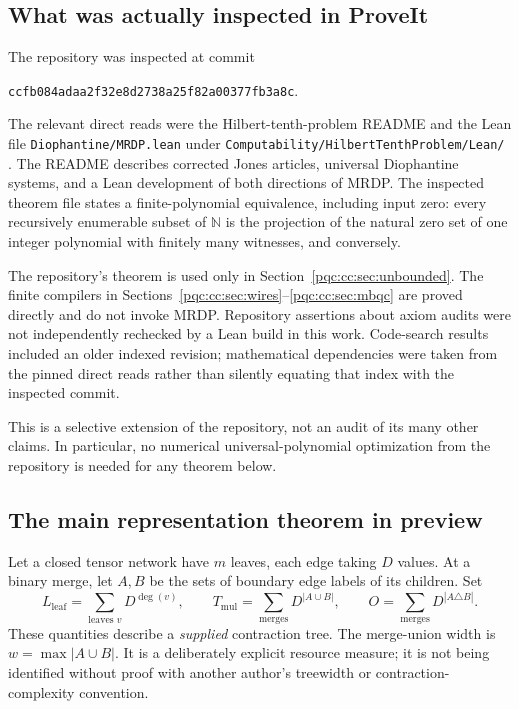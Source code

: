 \documentclass[11pt,letterpaper]{article}
\numberwithin{equation}{section}
\theoremstyle{definition}
\theoremstyle{remark}
\newcommand{\N}{\mathbb N}
\newcommand{\SHA}{\texttt{ccfb084adaa2f32e8d2738a25f82a00377fb3a8c}}
\newcommand{\Lleaf}{L_{\mathrm{leaf}}}
\newcommand{\Tmul}{T_{\mathrm{mul}}}
\begin{document}
\subsection{What was actually inspected in ProveIt}

The repository was inspected at commit
\begin{center}\small\SHA.\end{center}
The relevant direct reads were the Hilbert-tenth-problem README and the Lean
file \texttt{Diophantine/MRDP.lean} under
\texttt{Computability/HilbertTenthProblem/Lean/} \cite{b62s10-ProveItReadme,b62s10-ProveItMRDP}.
The README describes corrected Jones articles, universal Diophantine systems,
and a Lean development of both directions of MRDP. The inspected theorem file
states a finite-polynomial equivalence, including input zero: every recursively
enumerable subset of $\N$ is the projection of the natural zero set of one
integer polynomial with finitely many witnesses, and conversely.

The repository's theorem is used only in Section~\ref{pqc:cc:sec:unbounded}. The finite
compilers in Sections~\ref{pqc:cc:sec:wires}--\ref{pqc:cc:sec:mbqc} are proved directly and do
not invoke MRDP. Repository assertions about axiom audits were not independently
rechecked by a Lean build in this work. Code-search results included an older
indexed revision; mathematical dependencies were taken from the pinned direct
reads rather than silently equating that index with the inspected commit.

This is a selective extension of the repository, not an audit of its many other
claims. In particular, no numerical universal-polynomial optimization from the
repository is needed for any theorem below.

\subsection{The main representation theorem in preview}

Let a closed tensor network have $m$ leaves, each edge taking $D$ values. At a
binary merge, let $A,B$ be the sets of boundary edge labels of its children. Set
\begin{equation}
 \Lleaf=\sum_{\text{leaves }v}D^{\deg(v)},\qquad
 \Tmul=\sum_{\text{merges}}D^{|A\cup B|},\qquad
 O=\sum_{\text{merges}}D^{|A\triangle B|}.
\label{pqc:cc:eq:profile-preview}
\end{equation}
These quantities describe a \emph{supplied} contraction tree. The merge-union
width is $w=\max |A\cup B|$. It is a deliberately explicit resource measure; it
is not being identified without proof with another author's treewidth or
contraction-complexity convention.
\end{document}
